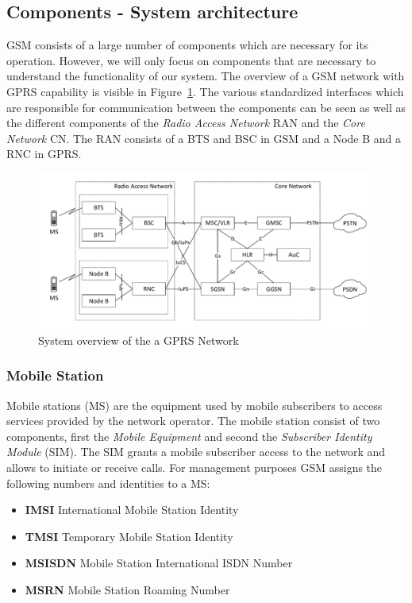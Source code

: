 \documentclass[master,english]{hgbthesis}
\begin{document}
\subsection{Components - System architecture}
GSM consists of a large number of components which are necessary for its operation. However, we will only focus on components that are necessary to understand the functionality of our system. The overview of a GSM network with GPRS capability is visible in Figure~\ref{fig:GSMNetwork}.  The various standardized interfaces which are responsible for communication between the components can be seen as well as the different components of the \emph{Radio Access Network} RAN and the \emph{Core Network} CN. The RAN consists of a BTS and BSC in GSM and a Node B and a RNC in GPRS.
\begin{figure}
	\centering
	\includegraphics[width=\linewidth]{./images/GSMNetwork}
	\caption{System overview of the a GPRS Network}
	\label{fig:GSMNetwork}
\end{figure}
\subsubsection{Mobile Station}
Mobile stations (MS) are the equipment used by mobile subscribers to access services provided by the network operator. The mobile station consist of two components, first the \emph{Mobile Equipment} and second the \emph{Subscriber Identity Module} (SIM). The SIM grants a mobile subscriber access to the network and allows to initiate or receive calls.
For management purposes GSM assigns the following numbers and identities to a MS:
\begin{itemize}
	\item \textbf{IMSI} International Mobile Station Identity
	\item \textbf{TMSI} Temporary Mobile Station Identity
	\item \textbf{MSISDN} Mobile Station International ISDN Number
	\item \textbf{MSRN} Mobile Station Roaming Number
\end{itemize}
\end{document}
